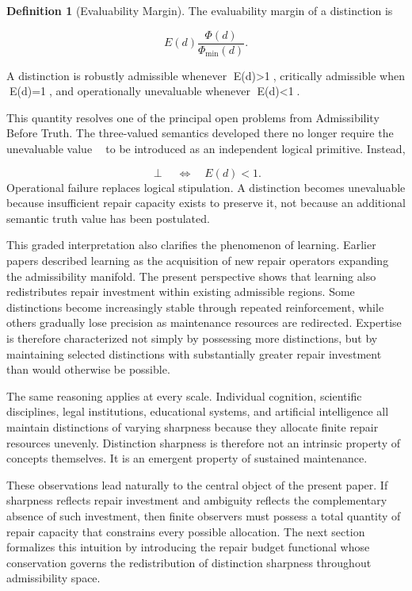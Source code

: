 \documentclass[12pt,oneside]{article}
\theoremstyle{plain}
\theoremstyle{definition}
\newtheorem{definition}[theorem]{Definition}
\theoremstyle{remark}
\begin{document}
\begin{definition}[Evaluability Margin]
The evaluability margin of a distinction is

\[
E(d)
\frac{\Phi(d)}
{\Phi_{\min}(d)}.
\]

A distinction is robustly admissible whenever E(d)>1, critically admissible when E(d)=1, and operationally unevaluable whenever E(d)<1.
\end{definition}

This quantity resolves one of the principal open problems from Admissibility Before Truth. The three-valued semantics developed there no longer require the unevaluable value \perp to be introduced as an independent logical primitive. Instead,

\[
\perp
\quad\Longleftrightarrow\quad
E(d)<1.
\]
Operational failure replaces logical stipulation. A distinction becomes unevaluable because insufficient repair capacity exists to preserve it, not because an additional semantic truth value has been postulated.

This graded interpretation also clarifies the phenomenon of learning. Earlier papers described learning as the acquisition of new repair operators expanding the admissibility manifold. The present perspective shows that learning also redistributes repair investment within existing admissible regions. Some distinctions become increasingly stable through repeated reinforcement, while others gradually lose precision as maintenance resources are redirected. Expertise is therefore characterized not simply by possessing more distinctions, but by maintaining selected distinctions with substantially greater repair investment than would otherwise be possible.

The same reasoning applies at every scale. Individual cognition, scientific disciplines, legal institutions, educational systems, and artificial intelligence all maintain distinctions of varying sharpness because they allocate finite repair resources unevenly. Distinction sharpness is therefore not an intrinsic property of concepts themselves. It is an emergent property of sustained maintenance.

These observations lead naturally to the central object of the present paper. If sharpness reflects repair investment and ambiguity reflects the complementary absence of such investment, then finite observers must possess a total quantity of repair capacity that constrains every possible allocation. The next section formalizes this intuition by introducing the repair budget functional whose conservation governs the redistribution of distinction sharpness throughout admissibility space.
\end{document}
